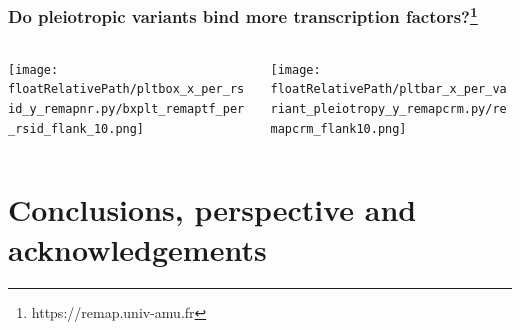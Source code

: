 \documentclass{beamer}
\newcommand*{\floatRelativePath}{../out/gwas417/pval_5e-08/r2_0.1/kb_1000/window_1000000/75_50}%
\begin{document}
        \begin{frame}
            \frametitle{Do pleiotropic variants bind more transcription factors?\footnote{https://remap.univ-amu.fr}}

            \begin{columns}
                \begin{column}{0.5\textwidth}
                    \begin{center}
                        \texttt{[image: \\floatRelativePath/pltbox\_x\_per\_rsid\_y\_remapnr.py/bxplt\_remaptf\_per\_rsid\_flank\_10.png]}
                    \end{center}
                \end{column}
                \begin{column}{0.5\textwidth}  %
                    \begin{center}
                        \texttt{[image: \\floatRelativePath/pltbar\_x\_per\_variant\_pleiotropy\_y\_remapcrm.py/remapcrm\_flank10.png]}
                    \end{center}
                \end{column}
            \end{columns}


        \end{frame}

        \section{Conclusions, perspective and acknowledgements} %
\end{document}
